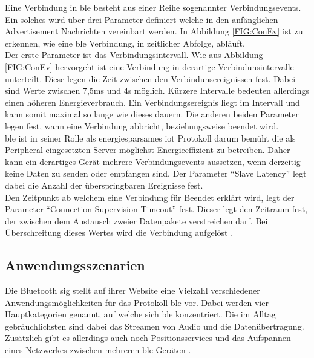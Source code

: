 \noindent Eine Verbindung in \ac{ble} besteht aus einer Reihe sogenannter Verbindungsevents. Ein solches wird über drei Parameter definiert welche in den anfänglichen Advertisement Nachrichten vereinbart werden. In Abbildung \ref{FIG:ConEv} ist zu erkennen, wie eine \ac{ble} Verbindung, in zeitlicher Abfolge, abläuft.\\

\noindent Der erste Parameter ist das Verbindungsintervall. Wie aus Abbildung \ref{FIG:ConEv} hervorgeht ist eine Verbindung in derartige Verbindunsintervalle unterteilt. Diese legen die Zeit zwischen den Verbindunsereignissen fest. Dabei sind Werte zwischen 7,5ms und 4s möglich. Kürzere Intervalle bedeuten allerdings einen höheren Energieverbrauch. Ein Verbindungsereignis liegt im Intervall und kann somit maximal so lange wie dieses dauern. Die anderen beiden Parameter legen fest, wann eine Verbindung abbricht, beziehungsweise beendet wird.\\ 

\noindent \ac{ble} ist in seiner Rolle als energiesparsames \ac{iot} Protokoll darum bemüht die als Peripheral eingesetzten Server möglichst Energieeffizient zu betreiben. Daher kann ein derartiges Gerät mehrere Verbindungsevents aussetzen, wenn derzeitig keine Daten zu senden oder empfangen sind. Der Parameter "`Slave Latency"' legt dabei die Anzahl der überspringbaren Ereignisse fest.\\

\noindent Den Zeitpunkt ab welchem eine Verbindung für Beendet erklärt wird, legt der Parameter "`Connection Supervision Timeout"' fest. Dieser legt den Zeitraum fest, der zwischen dem Austausch zweier Datenpakete verstreichen darf. Bei Überschreitung dieses Wertes wird die Verbindung aufgelöst \cite[Seite 22f]{Townsend14:GSB}.\\

\subsection{Anwendungsszenarien}
\label{ss:funktionsweise:anwendungen}

\noindent Die Bluetooth \ac{sig} stellt auf ihrer Website eine Vielzahl verschiedener Anwendungsmöglichkeiten für das Protokoll \ac{ble} vor. Dabei werden vier Hauptkategorien genannt, auf welche sich \ac{ble} konzentriert. Die im Alltag gebräuchlichsten sind dabei das Streamen von Audio und die Datenübertragung. Zusätzlich gibt es allerdings auch noch Positionsservices und das Aufspannen eines Netzwerkes zwischen mehreren \ac{ble} Geräten \cite{BLU20:WWW}.\\

